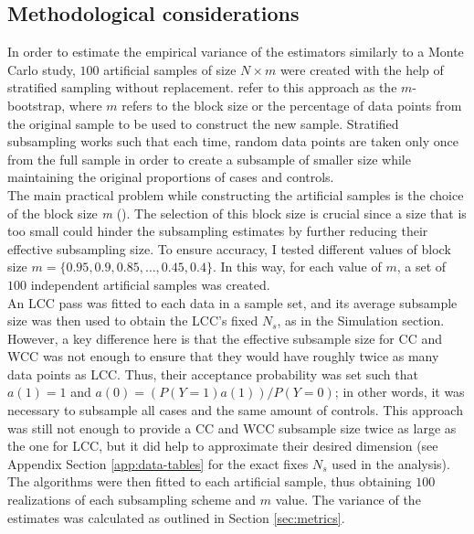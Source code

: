 \subsection{Methodological considerations}

In order to estimate the empirical variance of the estimators similarly to a Monte Carlo study, $100$ artificial samples of size $N \times m$ were created with the help of stratified sampling without replacement. \textcite{bickel2008choice} refer to this approach as the $m$-bootstrap, where $m$ refers to the block size or the percentage of data points from the original sample to be used to construct the new sample. Stratified subsampling works such that each time, random data points are taken only once from the full sample in order to create a subsample of smaller size while maintaining the original proportions of cases and controls. \\

The main practical problem while constructing the artificial samples is the choice of the block size \textit{m} (\cite{politis1999subsampling}). The selection of this block size is crucial since a size that is too small could hinder the subsampling estimates by further reducing their effective subsampling size. To ensure accuracy, I tested different values of block size $m=\{0.95, 0.9, 0.85, \dots, 0.45, 0.4\}$. In this way, for each value of $m$, a set of $100$ independent artificial samples was created. \\

An LCC pass was fitted to each data in a sample set, and its average subsample size was then used to obtain the LCC's fixed $N_s$, as in the Simulation section. However, a key difference here is that the effective subsample size for CC and WCC was not enough to ensure that they would have roughly twice as many data points as LCC. Thus, their acceptance probability was set such that $a(1)=1$ and $a(0) = (P(Y=1)a(1))/P(Y=0)$; in other words, it was necessary to subsample all cases and the same amount of controls. This approach was still not enough to provide a CC and WCC subsample size twice as large as the one for LCC, but it did help to approximate their desired dimension (see Appendix Section \ref{app:data-tables} for the exact fixes $N_s$ used in the analysis). The algorithms were then fitted to each artificial sample, thus obtaining $100$ realizations of each subsampling scheme and $m$ value. The variance of the estimates was calculated as outlined in Section \ref{sec:metrics}. 


